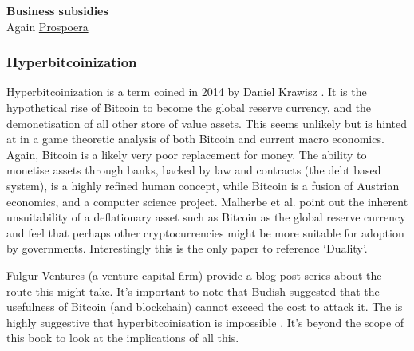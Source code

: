 \textbf{Business subsidies}\\
Again \href{https://davisclute.medium.com/visiting-a-startup-city-in-honduras-73d9c026ee6d}{Prospoera}
\subsubsection{Hyperbitcoinization}
Hyperbitcoinization is a term coined in 2014 by Daniel Krawisz \cite{krawisz2014hyperbitcoinization}. It is the hypothetical rise of Bitcoin to become the global reserve currency, and the demonetisation of all other store of value assets. This seems unlikely but is hinted at in a game theoretic analysis of both Bitcoin and current macro economics. Again, Bitcoin is a likely very poor replacement for money. The ability to monetise assets through banks, backed by law and contracts (the debt based system), is a highly refined human concept, while Bitcoin is a fusion of Austrian economics, and a computer science project. Malherbe et al. point out the inherent unsuitability of a deflationary asset such as Bitcoin as the global reserve currency \cite{malherbe2019cryptocurrencies} and feel that perhaps other cryptocurrencies might be more suitable for adoption by governments.  Interestingly this is the only paper to reference `Duality'.\par  Fulgur Ventures (a venture capital firm) provide a \href{https://medium.com/@fulgur.ventures/the-roads-to-hyperbitcoinization-part-1-27dc84d0e5e5}{blog post series} about the route this might take. It's important to note that Budish suggested that the usefulness of Bitcoin (and blockchain) cannot exceed the cost to attack it. The is highly suggestive that hyperbitcoinisation is impossible \cite{budish2018economic}. It's beyond the scope of this book to look at the implications of all this. 

